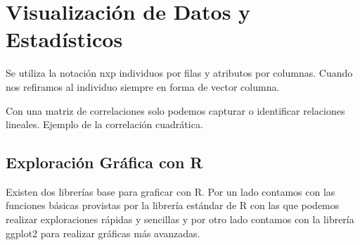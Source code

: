 
\newcommand{\estudiante}{García Justel, Alan}
\newcommand{\titulo}{MÁSTER EN INGENIERÍA COMPUTACIONAL Y SISTEMAS INTELIGENTES}
\newcommand{\asignatura}{EXPLORACIÓN Y ANÁLISIS DE DATOS}
\newcommand{\portada}{common/no_signal.png}
\newcommand{\colorportada}{title_green}
\newcommand{\curso}{2024-2025}



\newpage

\section{Visualización de Datos y Estadísticos}
Se utiliza la notación nxp individuos por filas y atributos por columnas. Cuando nos refiramos al individuo siempre en forma de vector columna.

Con una matriz de correlaciones solo podemos capturar o identificar relaciones lineales. Ejemplo de la correlación cuadrática.



\subsection{Exploración Gráfica con R}
Existen dos librerías base para graficar con R. Por un lado contamos con las funciones básicas provistas por la librería estándar de R con las que podemos realizar exploraciones rápidas y sencillas y por otro lado contamos con la librería ggplot2 para realizar gráficas más avanzadas.

